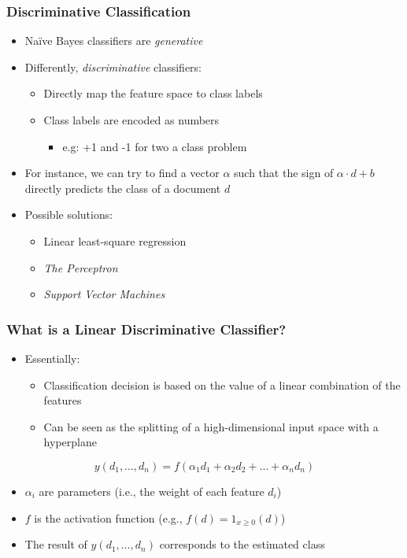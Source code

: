 \documentclass{beamer}
\begin{document}
\begin{frame} \frametitle{Discriminative Classification}

  \begin{itemize}
  \item Na{\"i}ve Bayes classifiers are \emph{generative}
  \item Differently, \emph{discriminative} classifiers:
    \begin{itemize}
    \item Directly map the feature space to class labels
    \item Class labels are encoded as numbers
      \begin{itemize}
      \item e.g: +1 and -1 for two a class problem
      \end{itemize}
    \end{itemize}
  \item For instance, we can try to find a vector $\alpha$ such that the sign
    of $\alpha \cdot d + b$ directly predicts the class of a document $d$
  \item Possible solutions:
    \begin{itemize}
    \item Linear least-square regression
    \item \emph{The Perceptron}
    \item \emph{Support Vector Machines}
    \end{itemize}
  \end{itemize}
  
\end{frame}



\begin{frame} \frametitle{What is a Linear Discriminative Classifier?}
  \begin{itemize}
  \item Essentially:
    \begin{itemize}
    \item Classification decision is based on the value of a linear combination of the features
    \item Can be seen as the splitting of a high-dimensional input space with a hyperplane
    \end{itemize}
  \end{itemize}
  \begin{equation*}
    y(d_1,\ldots,d_n) = f(\alpha_1d_1 + \alpha_2d_2 + \ldots + \alpha_nd_n)
  \end{equation*}
  \begin{itemize}
    \item $\alpha_i$ are parameters (i.e., the weight of each feature $d_i$)
    \item $f$ is the activation function (e.g., $f(d) = 1_{x \geq 0}(d)$)
    \item The result of $y(d_1,\ldots,d_n)$ corresponds to the estimated class
  \end{itemize}
\end{frame}
\end{document}
